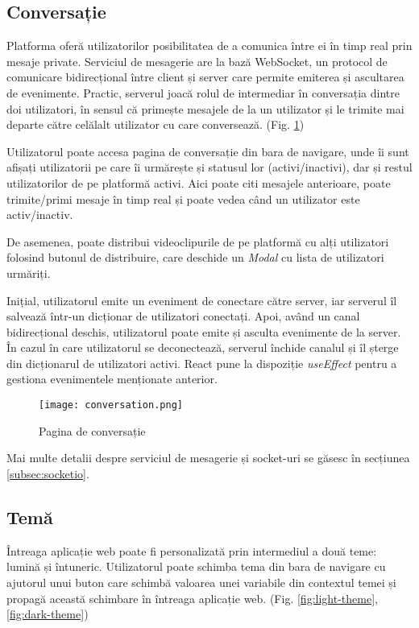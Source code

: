 \subsection{Conversație}
Platforma oferă utilizatorilor posibilitatea de a comunica între ei în timp real prin mesaje private.
Serviciul de mesagerie are la bază WebSocket, un protocol de comunicare bidirecțional între client
și server care permite emiterea și ascultarea de evenimente. Practic, serverul joacă rolul de intermediar
în conversația dintre doi utilizatori, în sensul că primește mesajele de la un utilizator și le trimite
mai departe către celălalt utilizator cu care conversează. (Fig. \ref{fig:conversation})
\par
Utilizatorul poate accesa pagina de conversație din bara de navigare, unde îi sunt afișați utilizatorii
pe care îi urmărește și statusul lor (activi/inactivi), dar și restul utilizatorilor de pe platformă activi.
Aici poate citi mesajele anterioare, poate trimite/primi mesaje în timp real și poate vedea când un utilizator
este activ/inactiv.
\par
De asemenea, poate distribui videoclipurile de pe platformă cu alți utilizatori folosind butonul
de distribuire, care deschide un \textit{Modal} cu lista de utilizatori urmăriți.
\par
Inițial, utilizatorul emite un eveniment de conectare către server, iar serverul îl salvează într-un
dicționar de utilizatori conectați. Apoi, având un canal bidirecțional deschis, utilizatorul poate
emite și asculta evenimente de la server. În cazul în care utilizatorul se deconectează, serverul
închide canalul și îl șterge din dicționarul de utilizatori activi. React pune la dispoziție
\textit{useEffect} pentru a gestiona evenimentele menționate anterior.
\vspace{1em}
\begin{figure}[h]
    \centering
    \texttt{[image: conversation.png]}
    \caption{Pagina de conversație}
    \label{fig:conversation}
\end{figure}

\par
Mai multe detalii despre serviciul de mesagerie și socket-uri se găsesc în secțiunea \ref{subsec:socketio}.


\subsection{Temă}
Întreaga aplicație web poate fi personalizată prin intermediul a două teme: lumină și întuneric.
Utilizatorul poate schimba tema din bara de navigare cu ajutorul unui buton care schimbă
valoarea unei variabile din contextul temei și propagă această schimbare în întreaga
aplicație web. (Fig. \ref{fig:light-theme}, \ref{fig:dark-theme})

